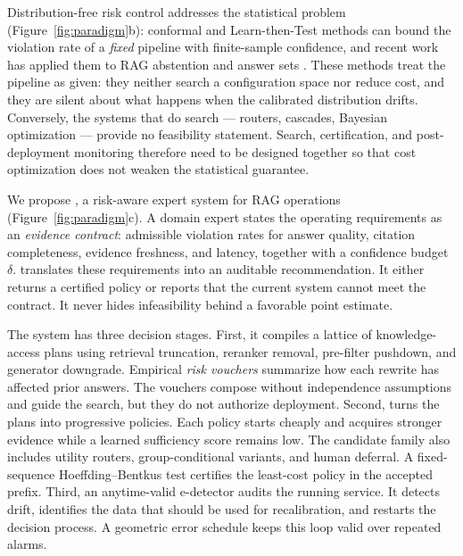 Distribution-free risk control addresses the statistical problem
(Figure~\ref{fig:paradigm}b): conformal
and Learn-then-Test methods \citep{angelopoulos2021ltt,
angelopoulos2024crc} can bound the violation rate of a \emph{fixed}
pipeline with finite-sample confidence, and recent work has applied
them to RAG abstention and answer sets \citep{li2024traq,kang2024crag}.
These methods treat the pipeline as given: they neither search a
configuration space nor reduce cost, and they are silent about what
happens when the calibrated distribution drifts. Conversely, the
systems that do search --- routers, cascades, Bayesian optimization ---
provide no feasibility statement. Search, certification, and
post-deployment monitoring therefore need to be designed together so
that cost optimization does not weaken the statistical guarantee.

We propose \system, a risk-aware expert system for RAG operations
(Figure~\ref{fig:paradigm}c). A domain expert states the operating
requirements as an \emph{evidence contract}: admissible violation rates
for answer quality, citation completeness, evidence freshness, and
latency, together with a confidence budget $\delta$. \system translates
these requirements into an auditable recommendation. It either returns
a certified policy or reports that the current system cannot meet the
contract. It never hides infeasibility behind a favorable point
estimate.

The system has three decision stages. First, it compiles a lattice of
knowledge-access plans using retrieval truncation, reranker removal,
pre-filter pushdown, and generator downgrade. Empirical
\emph{risk vouchers} summarize how each rewrite has affected prior
answers. The vouchers compose without independence assumptions and
guide the search, but they do not authorize deployment. Second,
\system turns the plans into progressive policies. Each policy starts
cheaply and acquires stronger evidence while a learned sufficiency
score remains low. The candidate family also includes utility routers,
group-conditional variants, and human deferral. A fixed-sequence
Hoeffding--Bentkus test certifies the least-cost policy in the accepted
prefix. Third, an anytime-valid e-detector audits the running service.
It detects drift, identifies the data that should be used for
recalibration, and restarts the decision process. A geometric error
schedule keeps this loop valid over repeated alarms.

